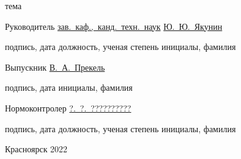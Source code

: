 \begin{spacing}{1}
\begin{centering}
    \end{centering}

    \vspace{-4pt}
    \centerline{\footnotesize тема}

    \vfill
    \vfill
    \vfill

    Руководитель
    \hfill
    \uline{\hspace{10ex}}
    \hspace{3.5ex}
    \uline{зав.~каф.,~канд.~техн.~наук}
    \hspace{2ex}
    \uline{Ю.~Ю.~Якунин}
    \par
    \vspace{-4pt}
    \par
    \hfill
    {\footnotesize подпись, дата}
    \hspace{7.3ex}
    {\footnotesize должность, ученая степень}
    \hspace{6ex}
    {\footnotesize инициалы, фамилия}


    Выпускник
    \hfill
    \uline{\hspace{10ex}}
    \hspace{32ex}
    \uline{В.~А.~Прекель}
    \par
    \vspace{-4pt}
    \par
    \hfill
    {\footnotesize подпись, дата}
    \hspace{32.3ex}
    {\footnotesize инициалы, фамилия}

    Нормоконтролер
    \hfill
    \uline{\hspace{10ex}}
    \hspace{3.5ex}
    \uline{\hspace{24.5ex}}
    \hspace{2ex}
    \uline{?.~?.~??????????}
    \par
    \vspace{-4pt}
    \par
    \hfill
    {\footnotesize подпись, дата}
    \hspace{7.3ex}
    {\footnotesize должность, ученая степень}
    \hspace{6ex}
    {\footnotesize инициалы, фамилия}

    \vfill

    \centerline{Красноярск 2022}

\end{spacing}


\clearpage

\setcounter{page}{2}
